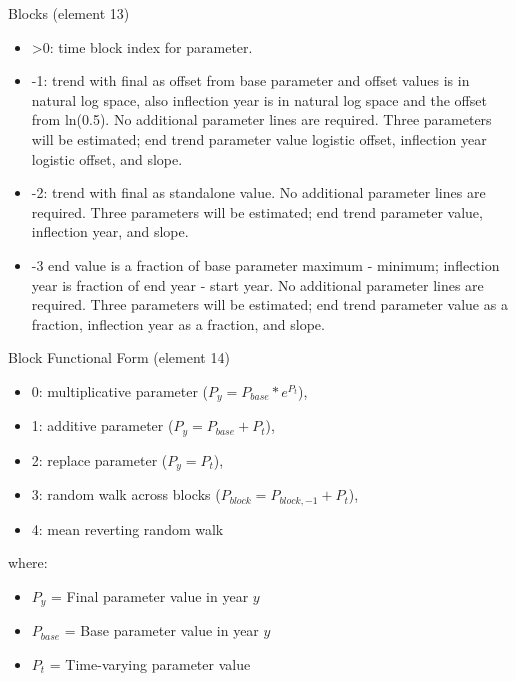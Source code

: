 	
\item Blocks (element 13)
	\begin{itemize}
		\item >0: time block index for parameter.
		\item -1: trend with final as offset from base parameter and offset values is in natural log space, also inflection year is in natural log space and the offset from ln(0.5). No additional parameter lines are required.  Three parameters will be estimated; end trend parameter value logistic offset, inflection year logistic offset, and slope.
		\item -2: trend with final as standalone value. No additional parameter lines are required. Three parameters will be estimated; end trend parameter value, inflection year, and slope.
		\item -3 end value is a fraction of base parameter maximum - minimum; inflection year is fraction of end year - start year. No additional parameter lines are required. Three parameters will be estimated; end trend parameter value as a fraction, inflection year as a fraction, and slope.
	\end{itemize}
	
\item Block Functional Form (element 14)
	\begin{itemize}
		\item 0: multiplicative parameter ($P_{y} = P_{base}*e^{P_t}$),
		\item 1: additive parameter ($P_{y} = P_{base} + P_t$),
		\item 2: replace parameter ($P_{y} = P_t$),
		\item 3: random walk across blocks ($P_{block} = P_{block,-1} + P_t$),
		\item 4: mean reverting random walk
	\end{itemize}
	where:
	\begin{itemize}
        \item $P_{y}$ = Final parameter value in year $y$
        \item $P_{base}$ = Base parameter value in year $y$
		\item $P_{t}$ = Time-varying parameter value
\end{itemize}